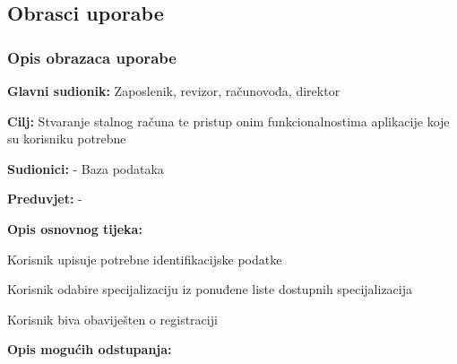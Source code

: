 			\eject 
			
			
				
			\subsection{Obrasci uporabe}
				
				\subsubsection{Opis obrazaca uporabe}
					

					\noindent {}
					\begin{packed_item}
	
						\item \textbf{Glavni sudionik:} Zaposlenik, revizor, računovođa, direktor
						\item  \textbf{Cilj:} Stvaranje stalnog računa te pristup onim funkcionalnostima aplikacije koje su korisniku potrebne
						\item  \textbf{Sudionici:} - Baza podataka
						\item  \textbf{Preduvjet:} - 
						\item  \textbf{Opis osnovnog tijeka:}
						
						\item[] \begin{packed_enum}
	
							\item Korisnik upisuje potrebne identifikacijske podatke
							\item Korisnik odabire specijalizaciju iz ponuđene liste dostupnih specijalizacija
							\item Korisnik biva obaviješten o registraciji
						\end{packed_enum}
						
						\item  \textbf{Opis mogućih odstupanja:}
						
						\item[] \begin{packed_item}
	

\end{packed_item}
\end{packed_item}
